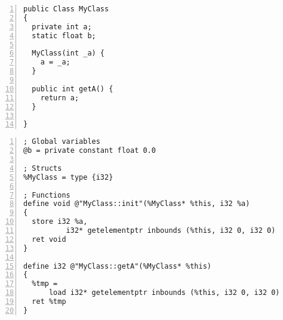 \begin{lstlisting}[frame=single, numbers=left, numberstyle=\tiny, showstringspaces=false, caption={Sample Java Class},label=lst:java_class]
public Class MyClass
{
  private int a;
  static float b;
  
  MyClass(int _a) {
    a = _a;
  }
  
  public int getA() {
    return a;
  }

}
\end{lstlisting}

\newpage

\lstset{
	language=Assembly,
	basicstyle=\small,
	stringstyle=\ttfamily
}

\begin{lstlisting}[frame=single, numbers=left, numberstyle=\tiny, showstringspaces=false, caption={LLVM Module for Listing \ref{lst:java_class}},label=lst:llvm_mod]
; Global variables
@b = private constant float 0.0

; Structs
%MyClass = type {i32}

; Functions
define void @"MyClass::init"(%MyClass* %this, i32 %a)
{
  store i32 %a,
          i32* getelementptr inbounds (%this, i32 0, i32 0)
  ret void
}

define i32 @"MyClass::getA"(%MyClass* %this)
{
  %tmp =
      load i32* getelementptr inbounds (%this, i32 0, i32 0)
  ret %tmp
}
\end{lstlisting}
